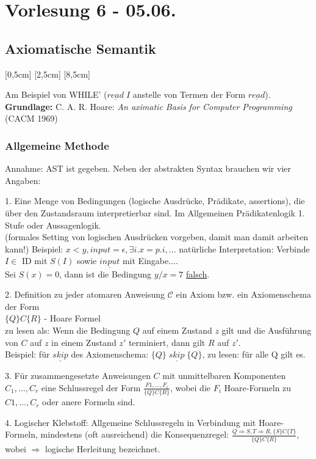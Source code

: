 \section{Vorlesung 6 - 05.06.}
\subsection{Axiomatische Semantik}
[0,5cm]
[2,5cm]
[8,5cm]


Am Beispiel von WHILE' ($\underline{read}\;I$ anstelle von Termen der Form $\underline{read}$).\\
\textbf{Grundlage:} C. A. R. Hoare: \emph{An aximatic Basis for Computer Programming} (CACM 1969)
\subsubsection{Allgemeine Methode}
Annahme: AST ist gegeben.
Neben der abstrakten Syntax brauchen wir vier Angaben:
\begin{compactitem}
	\item[1.] Eine Menge von Bedingungen (logische Ausdrücke, Prädikate, assertions), die über den Zustandsraum interpretierbar sind. Im Allgemeinen Prädikatenlogik 1. Stufe oder Aussagenlogik.\\
	(formales Setting von logischen Ausdrücken vorgeben, damit man damit arbeiten kann!)
	Beispiel: $x < y, input = \epsilon, \exists i.x=p.i, ...$ 
	natürliche Interpretation: Verbinde $I \in$ ID mit $S(I)$ sowie $\underline{input}$ mit Eingabe....\\
	Sei $S(x)=0$, dann ist die Bedingung $y/x=7$ \underline{falsch}.
	\item[2.] Definition zu jeder atomaren Anweisung $\mathcal{C}$ ein Axiom bzw. ein Axiomenschema der Form\\
	$\{Q\}C\{R\}$ - Hoare Formel\\
	zu lesen als: Wenn die Bedingung $Q$ auf einem Zustand $z$ gilt und die Ausführung von $C$ auf $z$ in einem Zustand $z'$ terminiert, dann gilt $R$ auf $z'$.\\
	Beispiel: für $\underline{skip}$ des Axiomenschema: $\{Q\}\;\underline{skip}\;\{Q\}$, zu lesen: für alle Q gilt es.
	\item[3.] Für zusammengesetzte Anweisungen $C$ mit unmittelbaren Komponenten $C_1,\dots,C_r$ eine Schlussregel der Form $\frac{F1,\dots,F_i}{\{Q\}C\{R\}}$, wobei die $F_i$ Hoare-Formeln zu $C1, \dots, C_r$ oder anere Formeln sind.\\
	\item[4.] Logischer Klebstoff: Allgemeine Schlussregeln in Verbindung mit Hoare-Formeln, mindestens (oft ausreichend) die Konsequenzregel: $\frac{Q\Rightarrow S, T \Rightarrow R, \{S\}C\{T\}}{\{Q\}C\{R\}}$, wobei $\Rightarrow$ logische Herleitung bezeichnet.\\
\end{compactitem}

